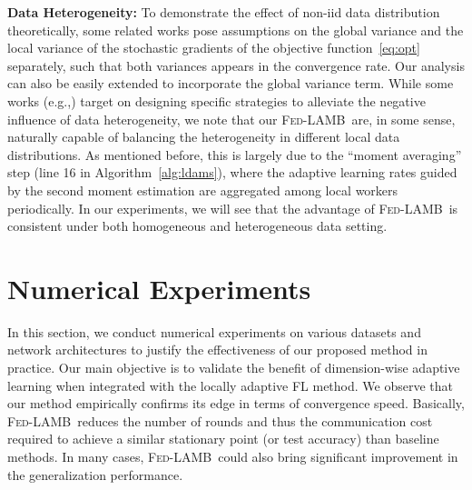 \documentclass[11pt]{article}
\newcommand{\algo}{\textsc{Fed-LAMB}}
\begin{document}
\medskip
\textbf{Data Heterogeneity:} To demonstrate the effect of non-iid data distribution theoretically, some related works pose assumptions on the global variance and the local variance of the stochastic gradients of the objective function~\eqref{eq:opt} separately, such that both variances appears in the convergence rate. Our analysis can also be easily extended to incorporate the global variance term. While some works (e.g.,\citet{karimireddy2019scaffold}) target on designing specific strategies to alleviate the negative influence of data heterogeneity, we note that our \algo\ are, in some sense, naturally capable of balancing the heterogeneity in different local data distributions. As mentioned before, this is largely due to the ``moment averaging'' step (line 16 in Algorithm~\ref{alg:ldams}), where the adaptive learning rates guided by the second moment estimation are aggregated among local workers periodically. In our experiments, we will see that the advantage of \algo\ is consistent under both homogeneous and heterogeneous data setting. 





\section{Numerical Experiments}\label{sec:numerical}

In this section, we conduct numerical experiments on various datasets and network architectures to justify the effectiveness of our proposed method in practice. Our main objective is to validate the benefit of dimension-wise adaptive learning when integrated with the locally adaptive FL method.
We observe that our method empirically confirms its edge in terms of convergence speed.
Basically, \algo\ reduces the number of rounds and thus the communication cost required to achieve a similar stationary point (or test accuracy) than baseline methods. In many cases, \algo\ could also bring significant improvement in the generalization performance.
\end{document}
